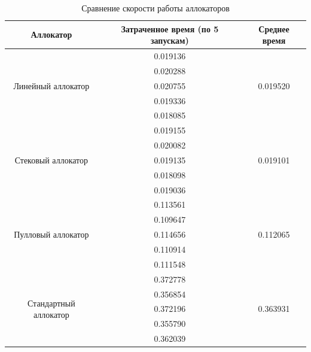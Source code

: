 \begin{table}[H]
\begin{tabular}{|c|c|c|}
	\hline Аллокатор & Затраченное время (по 5 запускам) & Среднее время \\
	\hline \multirow{5}{*}{Линейный аллокатор} & 0.019136 & \multirow{5}{*}{0.019520} \\
	\cline{2-2} & 0.020288 & \\
	\cline{2-2} & 0.020755 & \\
	\cline{2-2} & 0.019336 & \\
	\cline{2-2} & 0.018085 & \\
	\hline
	
	\hline \multirow{5}{*}{Стековый аллокатор} & 0.019155 & \multirow{5}{*}{0.019101} \\
	\cline{2-2} & 0.020082 & \\
	\cline{2-2} & 0.019135 & \\
	\cline{2-2} & 0.018098 & \\
	\cline{2-2} & 0.019036 & \\
	\hline
	
	\hline \multirow{5}{*}{Пулловый аллокатор} & 0.113561 & \multirow{5}{*}{0.112065} \\
	\cline{2-2} & 0.109647 & \\
	\cline{2-2} & 0.114656 & \\
	\cline{2-2} & 0.110914 & \\
	\cline{2-2} & 0.111548 & \\
	\hline

	\hline \multirow{5}{*}{Стандартный аллокатор} & 0.372778 & \multirow{5}{*}{0.363931} \\
	\cline{2-2} & 0.356854 & \\
	\cline{2-2} & 0.372196 & \\
	\cline{2-2} & 0.355790 & \\
	\cline{2-2} & 0.362039 & \\
	\hline

\end{tabular}
\caption{Сравнение скорости работы аллокаторов}
\label{tab:results}
\end{table}
